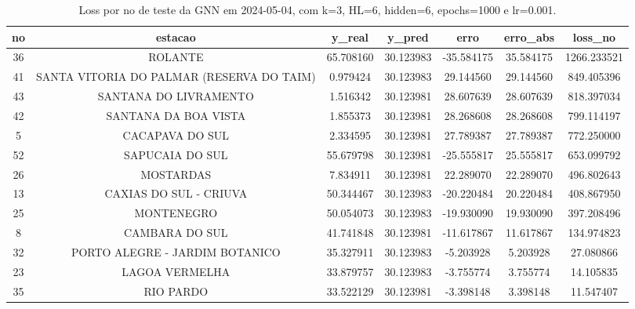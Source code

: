 \begin{table}[h]
\centering
\caption{Loss por no de teste da GNN em 2024-05-04, com k=3, HL=6, hidden=6, epochs=1000 e lr=0.001.}
\label{tab:gnn_loss_k3_hl6_h6_e1000_d20240504}
\begin{tabular}{ccccccc}
\toprule
no & estacao & y\_real & y\_pred & erro & erro\_abs & loss\_no \\
\midrule
36 & ROLANTE & 65.708160 & 30.123983 & -35.584175 & 35.584175 & 1266.233521 \\
41 & SANTA VITORIA DO PALMAR (RESERVA DO TAIM) & 0.979424 & 30.123983 & 29.144560 & 29.144560 & 849.405396 \\
43 & SANTANA DO LIVRAMENTO & 1.516342 & 30.123981 & 28.607639 & 28.607639 & 818.397034 \\
42 & SANTANA DA BOA VISTA & 1.855373 & 30.123981 & 28.268608 & 28.268608 & 799.114197 \\
5 & CACAPAVA DO SUL & 2.334595 & 30.123981 & 27.789387 & 27.789387 & 772.250000 \\
52 & SAPUCAIA DO SUL & 55.679798 & 30.123981 & -25.555817 & 25.555817 & 653.099792 \\
26 & MOSTARDAS & 7.834911 & 30.123981 & 22.289070 & 22.289070 & 496.802643 \\
13 & CAXIAS DO SUL - CRIUVA & 50.344467 & 30.123983 & -20.220484 & 20.220484 & 408.867950 \\
25 & MONTENEGRO & 50.054073 & 30.123983 & -19.930090 & 19.930090 & 397.208496 \\
8 & CAMBARA DO SUL & 41.741848 & 30.123981 & -11.617867 & 11.617867 & 134.974823 \\
32 & PORTO ALEGRE - JARDIM BOTANICO & 35.327911 & 30.123983 & -5.203928 & 5.203928 & 27.080866 \\
23 & LAGOA VERMELHA & 33.879757 & 30.123983 & -3.755774 & 3.755774 & 14.105835 \\
35 & RIO PARDO & 33.522129 & 30.123981 & -3.398148 & 3.398148 & 11.547407 \\
\bottomrule
\end{tabular}
\end{table}

